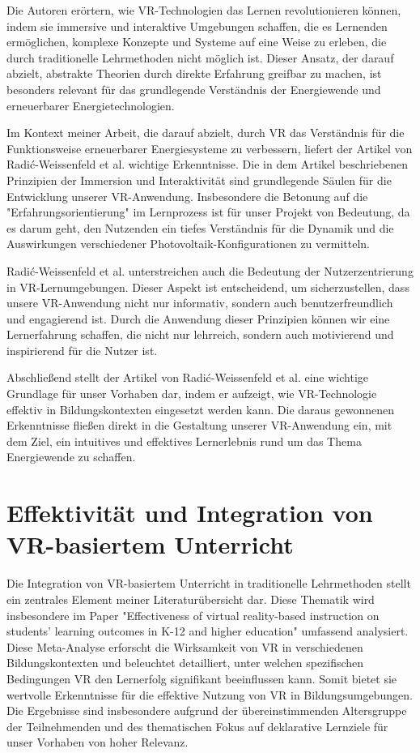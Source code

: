 \documentclass[draft]{vutinfth} %
\begin{document}
Die Autoren erörtern, wie VR-Technologien das Lernen revolutionieren können, indem sie immersive und interaktive Umgebungen schaffen, die es Lernenden ermöglichen, komplexe Konzepte und Systeme auf eine Weise zu erleben, die durch traditionelle Lehrmethoden nicht möglich ist. Dieser Ansatz, der darauf abzielt, abstrakte Theorien durch direkte Erfahrung greifbar zu machen, ist besonders relevant für das grundlegende Verständnis der Energiewende und erneuerbarer Energietechnologien.

Im Kontext meiner Arbeit, die darauf abzielt, durch VR das Verständnis für die Funktionsweise erneuerbarer Energiesysteme zu verbessern, liefert der Artikel von Radić-Weissenfeld et al. wichtige Erkenntnisse. Die in dem Artikel beschriebenen Prinzipien der Immersion und Interaktivität sind grundlegende Säulen für die Entwicklung unserer VR-Anwendung. Insbesondere die Betonung auf die "Erfahrungsorientierung" im Lernprozess ist für unser Projekt von Bedeutung, da es darum geht, den Nutzenden ein tiefes Verständnis für die Dynamik und die Auswirkungen verschiedener Photovoltaik-Konfigurationen zu vermitteln.

Radić-Weissenfeld et al. unterstreichen auch die Bedeutung der Nutzerzentrierung in VR-Lernumgebungen. Dieser Aspekt ist entscheidend, um sicherzustellen, dass unsere VR-Anwendung nicht nur informativ, sondern auch benutzerfreundlich und engagierend ist. Durch die Anwendung dieser Prinzipien können wir eine Lernerfahrung schaffen, die nicht nur lehrreich, sondern auch motivierend und inspirierend für die Nutzer ist.

Abschließend stellt der Artikel von Radić-Weissenfeld et al. eine wichtige Grundlage für unser Vorhaben dar, indem er aufzeigt, wie VR-Technologie effektiv in Bildungskontexten eingesetzt werden kann. Die daraus gewonnenen Erkenntnisse fließen direkt in die Gestaltung unserer VR-Anwendung ein, mit dem Ziel, ein intuitives und effektives Lernerlebnis rund um das Thema Energiewende zu schaffen.

\section{Effektivität und Integration von VR-basiertem Unterricht}

Die Integration von VR-basiertem Unterricht in traditionelle Lehrmethoden stellt ein zentrales Element meiner Literaturübersicht dar. Diese Thematik wird insbesondere im Paper "Effectiveness of virtual reality-based instruction on students' learning outcomes in K-12 and higher education" umfassend analysiert. Diese Meta-Analyse erforscht die Wirksamkeit von VR in verschiedenen Bildungskontexten und beleuchtet detailliert, unter welchen spezifischen Bedingungen VR den Lernerfolg signifikant beeinflussen kann. Somit bietet sie wertvolle Erkenntnisse für die effektive Nutzung von VR in Bildungsumgebungen. Die Ergebnisse sind insbesondere aufgrund der übereinstimmenden Altersgruppe der Teilnehmenden und des thematischen Fokus auf deklarative Lernziele für unser Vorhaben von hoher Relevanz.
\end{document}
